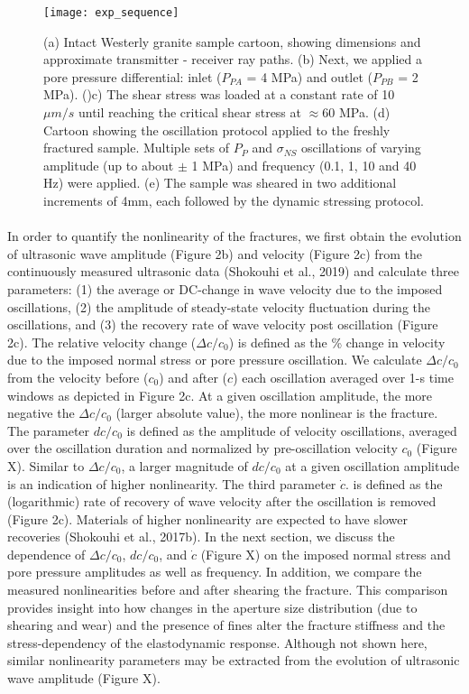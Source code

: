 \documentclass[letterpaper,10pt]{article}
\begin{document}
\newpage


\begin{figure}[ht]
	\centering
	\texttt{[image: exp\_sequence]}
	\caption[]{(a) Intact Westerly granite sample cartoon, showing dimensions and approximate transmitter - receiver ray paths. 
	(b) Next, we applied a pore pressure differential: inlet ($P_{PA}$ = 4 MPa) and outlet ($P_{PB}$ = 2 MPa). 
	()c) The shear stress was loaded at a constant rate of 10 $\mu m/s$ until reaching the critical shear stress at $ \approx $60 MPa. 
	(d) Cartoon showing the oscillation protocol applied to the freshly fractured sample. Multiple sets of $P_{P}$ and $ \sigma_{NS} $ oscillations of varying amplitude (up to about $ \pm $ 1 MPa) and frequency (0.1, 1, 10 and 40 Hz) were applied. 
	(e) The sample was sheared in two additional increments of 4mm, each followed by the dynamic stressing protocol.}
	\label{fig:exp_seq}
\end{figure}


\newpage


\paragraph{}
In order to quantify the nonlinearity of the fractures, we first obtain the evolution of ultrasonic wave amplitude (Figure 2b) and velocity (Figure 2c) from the continuously measured ultrasonic data  (Shokouhi et al., 2019) and calculate three parameters: (1) the average or DC-change in wave velocity due to the imposed oscillations, (2) the amplitude of steady-state velocity fluctuation during the oscillations, and (3) the recovery rate of wave velocity post oscillation (Figure 2c). The relative velocity change ($\Delta c/c_0$)
is defined as the \% change in velocity due to the imposed normal stress or pore pressure oscillation. We calculate $\Delta c/c_0$ 
from the velocity before ($c_0$) and after ($c$) each oscillation averaged over 1-s time windows as depicted in Figure 2c. At a given oscillation amplitude, the more negative the $\Delta c/c_0$ (larger absolute value), the more nonlinear is the fracture. The parameter 
$dc/c_0$ is defined as the amplitude of velocity oscillations, averaged over the oscillation duration and normalized by pre-oscillation velocity $c_0$ (Figure X). Similar to $\Delta c/c_0$, a larger magnitude of $dc/c_0$ at a given oscillation amplitude is an indication of higher nonlinearity. The third parameter 
$\dot c$.
is defined as the (logarithmic) rate of recovery of wave velocity after the oscillation is removed (Figure 2c). Materials of higher nonlinearity are expected to have slower recoveries (Shokouhi et al., 2017b). In the next section, we discuss the dependence of 
$\Delta c/c_0$, $dc/c_0$, and $\dot c$ 
(Figure X) on the imposed normal stress and pore pressure amplitudes as well as frequency.  In addition, we compare the measured nonlinearities before and after shearing the fracture. This comparison provides insight into how changes in the aperture size distribution (due to shearing and wear) and the presence of fines alter the fracture stiffness and the stress-dependency of the elastodynamic response. Although not shown here, similar nonlinearity parameters may be extracted from the evolution of ultrasonic wave amplitude (Figure X). 
\end{document}
